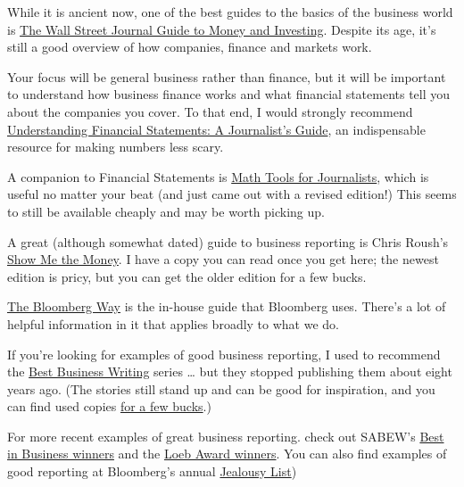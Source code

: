\documentclass[
  11pt,
  american,
  letterpaperpaper,
  extrafontsizes,onecolumn,openright
  ]{memoir}
\begin{document}
While it is ancient now, one of the best guides to the basics of the business world is \href{https://www.amazon.com/Street-Journal-Guide-Understanding-Investing/dp/0684869020}{The Wall Street Journal Guide to Money and Investing}. Despite its age, it's still a good overview of how companies, finance and markets work.

Your focus will be general business rather than finance, but it will be important to understand how business finance works and what financial statements tell you about the companies you cover. To that end, I would strongly recommend \href{https://www.amazon.com/Understanding-Financial-Statements-Journalists-Guide/dp/0972993738/ref=sr_1_1}{Understanding Financial Statements: A Journalist's Guide}, an indispensable resource for making numbers less scary.

A companion to Financial Statements is \href{https://www.amazon.com/Math-Tools-Journalists-Kathleen-Wickham/dp/0916242919/ref=sr_1_2}{Math Tools for Journalists}, which is useful no matter your beat (and just came out with a revised edition!) This seems to still be available cheaply and may be worth picking up.

A great (although somewhat dated) guide to business reporting is Chris Roush's \href{https://www.amazon.com/Show-Money-Economics-Communication-Routledge/dp/0805849556/ref=tmm_pap_swatch_0}{Show Me the Money}. I have a copy you can read once you get here; the newest edition is pricy, but you can get the older edition for a few bucks.

\href{https://www.amazon.com/Bloomberg-Way-Guide-Reporters-Editors/dp/1118030176/ref=sr_1_1}{The Bloomberg Way} is the in-house guide that Bloomberg uses. There's a lot of helpful information in it that applies broadly to what we do.

If you're looking for examples of good business reporting, I used to recommend the \href{https://www.foxtalebookshoppe.com/search/Starkman\%2C\%20Dean?type=author}{Best Business Writing} series \ldots{} but they stopped publishing them about eight years ago. (The stories still stand up and can be good for inspiration, and you can find used copies \href{https://www.amazon.com/s?k=starkman+dean\&crid=180T8U6GUGQ50\&sprefix=starkman+dean\%2Caps\%2C88\&ref=nb_sb_noss}{for a few bucks}.)

For more recent examples of great business reporting. check out SABEW's \href{https://sabew.org/contestsawards/best-in-business-past-honorees/}{Best in Business winners} and the \href{http://theloebawards.com/}{Loeb Award winners}. You can also find examples of good reporting at Bloomberg's annual \href{https://www.google.com/search?q=bloomberg+jealousy+list\&rlz=1C5GCEM_enUS1022US1022\&oq=bloomberg+jealous\&gs_lcrp=EgZjaHJvbWUqBggBEEUYOzIGCAAQRRg5MgYIARBFGDvSAQg0MTgyajBqN6gCALACAA\&sourceid=chrome\&ie=UTF-8}{Jealousy List})
\end{document}
